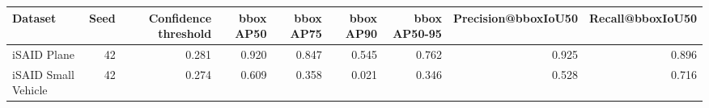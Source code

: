 \begin{tabular}{lrrrrrrrr}
\toprule
Dataset & Seed & Confidence threshold & bbox AP50 & bbox AP75 & bbox AP90 & bbox AP50-95 & Precision@bboxIoU50 & Recall@bboxIoU50 \\
\midrule
iSAID Plane & 42 & 0.281 & 0.920 & 0.847 & 0.545 & 0.762 & 0.925 & 0.896 \\
iSAID Small Vehicle & 42 & 0.274 & 0.609 & 0.358 & 0.021 & 0.346 & 0.528 & 0.716 \\
\bottomrule
\end{tabular}
